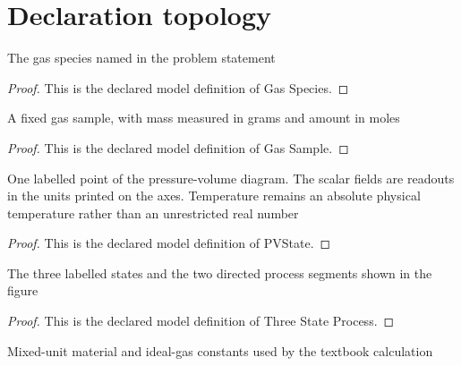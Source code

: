 \section{Declaration topology}
\begin{definition}
  \label{def:physics:phyx-mini-0372:phyxmini0372-gasspecies}
  The gas species named in the problem statement
\end{definition}
\begin{proof}
  This is the declared model definition of Gas Species.
\end{proof}
\begin{definition}
  \label{def:physics:phyx-mini-0372:phyxmini0372-gassample}
  A fixed gas sample, with mass measured in grams and amount in moles
\end{definition}
\begin{proof}
  This is the declared model definition of Gas Sample.
\end{proof}
\begin{definition}[PVState]
  \label{def:physics:phyx-mini-0372:phyxmini0372-pvstate}
  One labelled point of the pressure-volume diagram. The scalar fields are readouts in the units printed on the axes. Temperature remains an absolute physical temperature rather than an unrestricted real number
\end{definition}
\begin{proof}
  This is the declared model definition of PVState.
\end{proof}
\begin{definition}
  \label{def:physics:phyx-mini-0372:phyxmini0372-threestateprocess}
  The three labelled states and the two directed process segments shown in the figure
\end{definition}
\begin{proof}
  This is the declared model definition of Three State Process.
\end{proof}
\begin{definition}
  \label{def:physics:phyx-mini-0372:phyxmini0372-idealgasparameters}
  Mixed-unit material and ideal-gas constants used by the textbook calculation
\end{definition}
